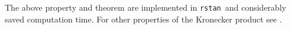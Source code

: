\documentclass[a4paper]{article}   	%
\newcommand{\rstan}{\texttt{rstan}}
\begin{document}
	The above property and theorem are implemented in \rstan\ and considerably saved computation time. For other properties of the Kronecker product see \textcite{Zhang2013Kronecker}.
	
	
	\renewcommand\bibname{References}%
	\printbibliography
\end{document}
